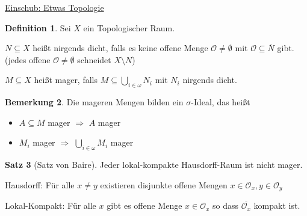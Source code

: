\documentclass[12pt,parskip=full]{scrartcl}
\newcommand{\heading}{\underline}
\theoremstyle{definition}
\newtheorem{theorem}{Satz}[section]
\newtheorem{definition}[theorem]{Definition}
\newtheorem{remark}[theorem]{Bemerkung}
\begin{document}
	\heading{Einschub: Etwas Topologie}
	
	\begin{definition}
		Sei $X$ ein Topologischer Raum.
		
		$N  \subseteq X$ heißt nirgends dicht, falls es keine offene Menge $\mathcal{O} \neq \emptyset$ mit $\mathcal{O} \subseteq \overline{N}$ gibt. (jedes offene $\mathcal{O} \neq \emptyset$ schneidet $X \setminus N$)
		
		$M \subseteq X$ heißt mager, falls $M \subseteq \bigcup_{i \in \omega} N_i$ mit $N_i$ nirgends dicht.
	\end{definition}

	\begin{remark}
		Die mageren Mengen bilden ein $\sigma$-Ideal, das heißt
		\begin{itemize}
			\item $A \subseteq M$ mager $\Rightarrow$ $A$ mager
			\item $M_i$ mager $\Rightarrow$ $\bigcup_{i \in \omega} M_i$ mager
		\end{itemize}
	\end{remark}

	\begin{theorem}[Satz von Baire]
		Jeder lokal-kompakte Hausdorff-Raum ist nicht mager.
		
		Hausdorff: Für alle $x \neq y$ existieren disjunkte offene Mengen $x \in \mathcal{O}_x, y \in \mathcal{O}_y$
		
		Lokal-Kompakt: Für alle $x$ gibt es offene Menge $x \in \mathcal{O}_x$ so dass $\overline{\mathcal{O}_x}$ kompakt ist.
	\end{theorem}
\end{document}
